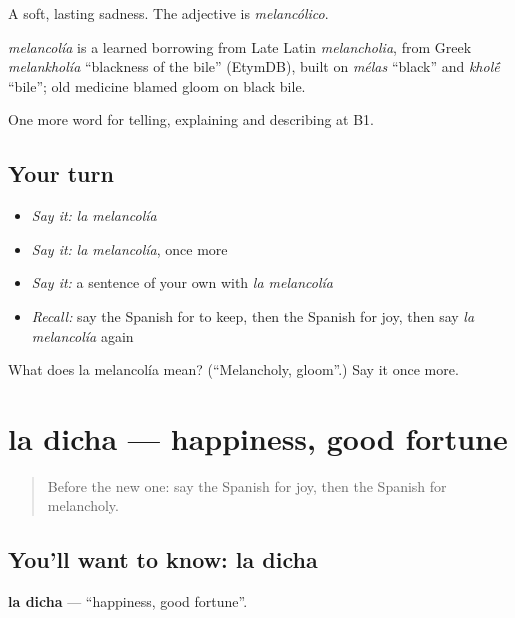 A soft, lasting sadness. The adjective is \emph{melancólico}.

\begin{cousinweb}
\emph{melancolía} is a learned borrowing from Late Latin \emph{melancholia}, from Greek \emph{melankholía} \textquotedblleft{}blackness of the bile\textquotedblright{} (EtymDB), built on \emph{mélas} \textquotedblleft{}black\textquotedblright{} and \emph{khol\'{\={e}}} \textquotedblleft{}bile\textquotedblright{}; old medicine blamed gloom on black bile.
\end{cousinweb}

\begin{grammarlens}[title={What you've built}]
One more word for telling, explaining and describing at B1.
\end{grammarlens}

\subsection*{Your turn}
\begin{itemize}
\raggedright
  \item \emph{Say it:} \emph{la melancolía}
  \item \emph{Say it:} \emph{la melancolía}, once more
  \item \emph{Say it:} a sentence of your own with \emph{la melancolía}
  \item \emph{Recall:} say the Spanish for to keep, then the Spanish for joy, then say \emph{la melancolía} again
\end{itemize}

\begin{tcolorbox}[breakable,colback=teal!4,colframe=teal!35!black,title={Before you move on}]
What does la melancolía mean? (\textquotedblleft{}Melancholy, gloom\textquotedblright{}.) Say it once more.
\end{tcolorbox}
\section[la dicha]{la dicha — happiness, good fortune}

\label{lesson:ES-C704-dicha}



\begin{quote}
Before the new one: say the Spanish for joy, then the Spanish for melancholy.
\end{quote}

\subsection*{You'll want to know: la dicha}
\textbf{la dicha} — \textquotedblleft{}happiness, good fortune\textquotedblright{}.


